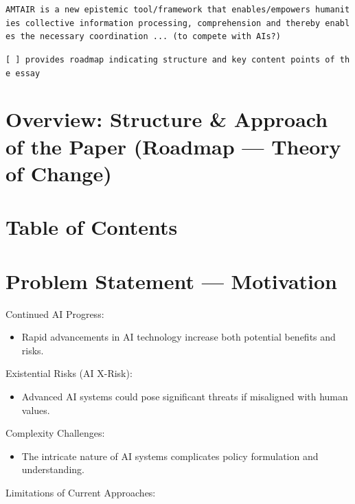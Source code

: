 \documentclass[
  letterpaper,
]{book}
\providecommand{\tightlist}{%
  \setlength{\itemsep}{0pt}\setlength{\parskip}{0pt}}
\begin{document}
\texttt{AMTAIR\ is\ a\ new\ epistemic\ tool/framework\ that\ enables/empowers\ humanities\ collective\ information\ processing,\ comprehension\ and\ thereby\ enables\ the\ necessary\ coordination\ ...\ (to\ compete\ with\ AIs?)}

\texttt{{[}\ {]}\ provides\ roadmap\ indicating\ structure\ and\ key\ content\ points\ of\ the\ essay}

\section{Overview: Structure \& Approach of the Paper (Roadmap ---
Theory of
Change)}\label{overview-structure-approach-of-the-paper-roadmap-theory-of-change}

\section{Table of Contents}\label{table-of-contents}

\section{Problem Statement ---
Motivation}\label{problem-statement-motivation}

Continued AI Progress:

\begin{itemize}
\tightlist
\item
  Rapid advancements in AI technology increase both potential benefits
  and risks.
\end{itemize}

Existential Risks (AI X-Risk):

\begin{itemize}
\tightlist
\item
  Advanced AI systems could pose significant threats if misaligned with
  human values.
\end{itemize}

Complexity Challenges:

\begin{itemize}
\tightlist
\item
  The intricate nature of AI systems complicates policy formulation and
  understanding.
\end{itemize}

Limitations of Current Approaches:
\end{document}

